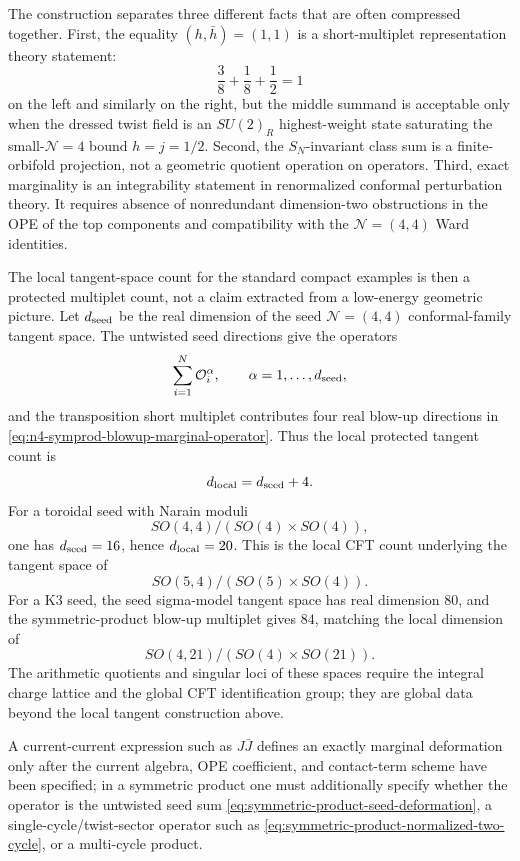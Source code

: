 The construction separates three different facts that are often compressed
together.  First, the equality \((h,\bar h)=(1,1)\) is a short-multiplet
representation theory statement:
\[
  \frac38+\frac18+\frac12=1
\]
on the left and similarly on the right, but the middle summand is acceptable
only when the dressed twist field is an \(SU(2)_R\) highest-weight state
saturating the small-\(\mathcal N=4\) bound \(h=j=1/2\).  Second, the
\(S_N\)-invariant class sum is a finite-orbifold projection, not a geometric
quotient operation on operators.  Third, exact marginality is an
integrability statement in
renormalized conformal perturbation theory.  It requires absence of
nonredundant dimension-two obstructions in the OPE of the top components and
compatibility with the \(\mathcal N=(4,4)\) Ward identities.

The local tangent-space count for the standard compact examples is then a
protected multiplet count, not a claim extracted from a low-energy geometric
picture.  Let \(d_{\rm seed}\) be the real dimension of the seed
\(\mathcal N=(4,4)\) conformal-family tangent space.  The untwisted seed
directions give the operators
\[
  \sum_{i=1}^N \mathcal O^{\alpha}_i,
  \qquad \alpha=1,\ldots,d_{\rm seed},
\]
and the transposition short multiplet contributes four real blow-up
directions in
\eqref{eq:n4-symprod-blowup-marginal-operator}.  Thus the local protected
tangent count is
\begin{equation}
  d_{\rm local}=d_{\rm seed}+4.
  \label{eq:n4-symprod-local-marginal-count}
\end{equation}
For a toroidal seed with Narain moduli
\[
  SO(4,4)/(SO(4)\times SO(4)),
\]
one has \(d_{\rm seed}=16\), hence \(d_{\rm local}=20\).  This is the local
CFT count underlying the tangent space of
\[
  SO(5,4)/(SO(5)\times SO(4)).
\]
For a K3 seed, the seed sigma-model tangent space has real dimension \(80\),
and the symmetric-product blow-up multiplet gives \(84\), matching the local
dimension of
\[
  SO(4,21)/(SO(4)\times SO(21)).
\]
The arithmetic quotients and singular loci of these spaces require the
integral charge lattice and the global CFT identification group; they are
global data beyond the local tangent construction above.

A current-current expression such as \(J\bar J\) defines an exactly marginal
deformation only after the current algebra, OPE coefficient, and contact-term
scheme have been specified; in a symmetric product one must additionally
specify whether the operator is the untwisted seed sum
\eqref{eq:symmetric-product-seed-deformation}, a single-cycle/twist-sector
operator such as \eqref{eq:symmetric-product-normalized-two-cycle}, or a
multi-cycle product.

